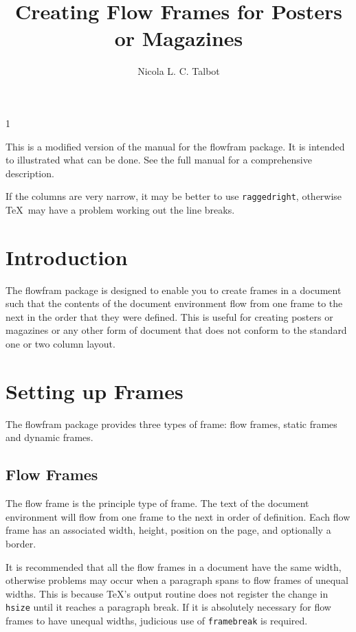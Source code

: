 \documentclass[a4paper]{article}
\newcommand{\sty}[1]{\textsf{#1}}
\newcommand{\env}[1]{\textsf{#1}}
\newcommand{\cmdname}[1]{\texttt{\symbol{92}#1}}
\begin{document}
\begin{staticcontents}{1}
\title{Creating Flow Frames for Posters or Magazines}
\author{Nicola L. C. Talbot}
\date{}
\maketitle
\end{staticcontents}

This is a modified version of the manual for the \sty{flowfram} package.
It is intended to illustrated what can be done. See the full manual for
a comprehensive description.

If the columns are very narrow, it may be better to
use \cmdname{raggedright}, otherwise \TeX\ may have a
problem working out the line breaks.

\section{Introduction}

The \sty{flowfram} package is designed to enable you to create
frames in a document such that the 
contents of the \env{document} environment flow from one 
frame to the next in the order that they were defined.  
This is useful for creating posters
or magazines or any other form of document that does not 
conform to the standard one or two column layout.

\section{Setting up Frames}

The \sty{flowfram} package provides three types of frame:
{flow frames}, {static 
frames} and {dynamic frames}.

\subsection{Flow Frames}

The flow frame is the principle type of frame.
The text of the \env{document} environment will flow from 
one frame to the next in order of definition. Each 
flow frame has an associated width, height, 
position on the page, and optionally a border.

It is recommended that all the flow frames in a document
have the same width, otherwise problems may occur
when a paragraph spans to flow frames of unequal
widths. This is because \TeX's output routine does not
register the change in \cmdname{hsize} until it reaches
a paragraph break. If it is absolutely necessary for 
flow frames to have unequal widths, judicious use of
\cmdname{framebreak} is required.
\end{document}
